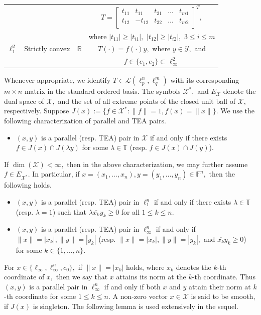 \documentclass{amsart}
\theoremstyle{definition}
\theoremstyle{remark}
\numberwithin{equation}{section}
\begin{document}
\begin{center}
\begin{tabular}{ |c|c|c|c|}
   		&&&$T=\begin{bmatrix}
   			t_{11}&t_{11}&t_{31}&\ldots& t_{m1}\\
   				t_{12}&-t_{12}&t_{32}&\ldots& t_{m2}\\
   			\end{bmatrix}^T,$\\
   		&&& where $|t_{11}|\geq |t_{i1}|,$ $|t_{12}|\geq |t_{i2}|,$ $3\leq i\leq m$\\
   			\hline
   			$\ell_1^2$ & Strictly convex & $\mathbb{R}$ &$T(\cdot)=f(\cdot)y,$ where $y\in \mathcal{Y}, $ and \\
   			&&&$f\in \{e_1,e_2\}\subset \ell_\infty^2$  \\
   			\hline
   	\end{tabular}
   \end{center}
   
     \medskip
  
  
 Whenever appropriate, we identify $T\in \mathcal{L}(\ell_p^n,\ell_q^m)$ with its corresponding $m\times n$ matrix in the standard ordered basis. The symbols $\mathcal{X}^*,$ and $E_{\mathcal{X}}$ denote the dual space of $\mathcal{X},$ and the set of all extreme points of the closed unit ball of  $\mathcal{X},$ respectively. Suppose $J(x):=\{f\in \mathcal{X}^*:\|f\|=1,f(x)=\|x\|\}.$ %
We use the following characterization of parallel and TEA pairs.
\begin{itemize}
\item $(x,y)$ is a parallel (resp. TEA) pair in $\mathcal{X}$ if and only if there exists $f\in J(x)\cap J(\lambda y)$ for some $\lambda\in \mathbb{T}$ (resp. $f\in J(x)\cap J(y)$).
\end{itemize}
If $\dim(\mathcal{X})<\infty,$ then in the above characterization, we may further assume $f\in E_{\mathcal{X}^*}.$ In particular, if $x=(x_1,\ldots,x_n), y=(y_1,\ldots,y_n)\in \mathbb{F}^n,$ %
 then the following holds.
\begin{itemize}
\item $(x,y)$ is a	parallel (resp. TEA) pair in $\ell_1^n$ if and only if there exists $\lambda\in \mathbb{T}$ (resp. $\lambda=1$) such that $\lambda \overline{x_k}y_k\geq 0$ for all $1\leq k\leq n.$
\item $(x,y)$ is a	parallel (resp. TEA) pair in $\ell_\infty^n$ if and only if $\|x\|=|x_k|,\|y\|=|y_k|$ (resp. $\|x\|=|x_k|,\|y\|=|y_k|,$ and $\overline{x_k}y_k\geq 0$) for some $k\in \{1,\ldots,n\}.$ 
\end{itemize}
 For $x\in \{\ell_\infty,\ell_\infty^n,c_0\},$ if $\|x\|=|x_k|$ holds, where $x_k$ denotes the $k$-th coordinate of  $x,$ then we say that $x$ attains its norm at the $k$-th coordinate. Thus $(x,y)$ is a parallel pair in $\ell_\infty^n$ if and only if both $x$ and $y$ attain their norm at $k$-th coordinate for some $1\leq k\leq n.$ A non-zero vector $x\in \mathcal{X}$ is said to be smooth, if $J(x)$ is singleton.
The following lemma is used extensively in the sequel.
\end{document}
